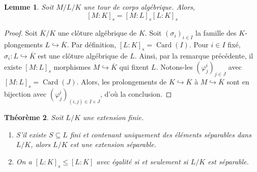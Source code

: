 \documentclass{article}
\DeclareMathOperator{\Card}{Card}
\theoremstyle{plain}
\newtheorem{theorem}{Théorème}[subsection]
\newtheorem{lemma}[theorem]{Lemme}
\theoremstyle{definition}
\theoremstyle{remark}
\begin{document}
\begin{lemma}
    Soit $M/L/K$ une tour de corps algébrique. Alors,
    \[[M : K]_s = [M : L]_s [L : K]_s\]
\end{lemma}

\begin{proof}
    Soit $\overline{K}/K$ une clôture algébrique de $K$. Soit $(\sigma_i)_{i\in I}$ la famille des $K$-plongements $L \hookrightarrow \overline{K}$. Par définition, $[L : K]_s = \Card(I)$. Pour $i\in I$ fixé, $\sigma_i : L \hookrightarrow \overline{K}$ est une clôture algébrique de $L$. Ainsi, par la remarque précédente, il existe $[M : L]_s$ morphismes $M \hookrightarrow \overline{K}$ qui fixent $L$. Notons-les $(\varphi_j^i)_{j \in J}$ avec $[M : L]_s = \Card(J)$. Alors, les prolongements de $K \hookrightarrow \overline{K}$ à $M \hookrightarrow \overline{K}$ sont en bijection avec $(\varphi_j^i)_{(i,j) \in I \times J}$, d'où la conclusion.
\end{proof}

\begin{theorem} \label{thmdegsep}
    Soit $L/K$ une extension finie.
    \begin{enumerate}
        \item S'il existe $S \subseteq L$ fini et contenant uniquement des éléments séparables dans $L/K$, alors $L/K$ est une extension séparable. 
        \item On a $[L : K]_s \le [L : K]$ avec égalité si et seulement si $L/K$ est séparable.
    \end{enumerate}
\end{theorem}
\end{document}
